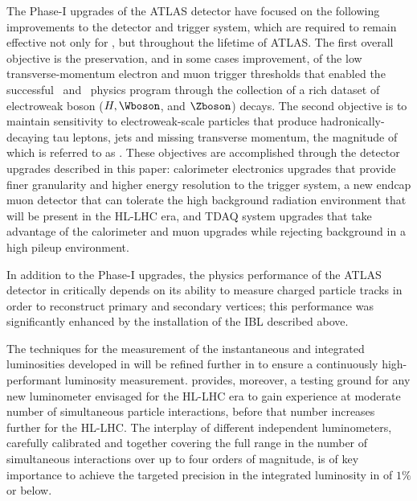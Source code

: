 \documentclass[cernpreprint, atlasdraft=false, UKenglish,british,orcidlogo, texmf, orcidlogo]{atlasdoc}
\begin{document}
The Phase-I upgrades of the ATLAS detector have focused on the following improvements to the detector and trigger system, which are required to remain effective not only for \RunThr, but throughout the lifetime of ATLAS. The first overall objective is the preservation, and in some cases improvement, of the low transverse-momentum electron and muon trigger thresholds that enabled the successful \RunOne\ and \RunTwo\ physics program through the collection of a rich dataset of electroweak boson ($H, \Wboson$, and $\Zboson$) decays. The second objective is to maintain sensitivity to electroweak-scale particles that produce hadronically-decaying tau leptons, jets and missing transverse momentum, the magnitude of which is referred to as \MET. These objectives are accomplished through the detector upgrades described in this paper: calorimeter electronics upgrades that provide finer granularity and higher energy resolution to the trigger system,  a new endcap muon detector that can tolerate the high background radiation environment that will be present in the \gls{HL-LHC} era, and \gls{TDAQ} system upgrades that take advantage of the calorimeter and muon upgrades while rejecting background in a high pileup environment.
 
In addition to the Phase-I upgrades, the physics performance of the ATLAS detector in \RunThr critically depends on its ability to measure charged particle tracks in order to reconstruct primary and secondary vertices; this performance was significantly enhanced by the installation of the \gls{IBL} described above.
 
The techniques for the measurement of the instantaneous and integrated luminosities developed in \RunTwo will be refined further in \RunThr to ensure a continuously high-performant luminosity measurement. \RunThr provides, moreover, a testing ground for any new luminometer envisaged for the \gls{HL-LHC} era to gain experience at moderate number of simultaneous particle interactions, before that number increases further for the \gls{HL-LHC}. The interplay of different independent luminometers, carefully calibrated and together covering the full range in the number of simultaneous interactions over up to four orders of magnitude, is of key importance to achieve the targeted precision in the integrated luminosity in \RunThr of $1\%$ or below.
 
\end{document}
